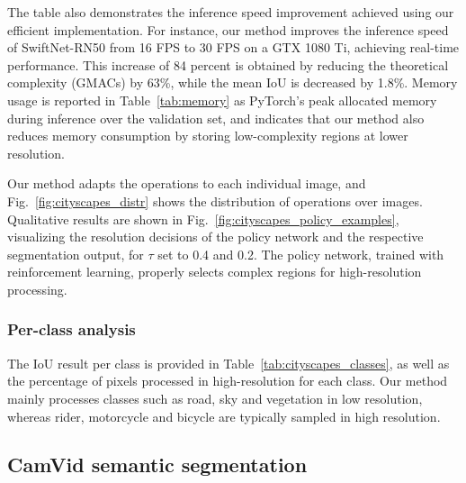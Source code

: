 The table also demonstrates the inference speed improvement achieved using our efficient implementation.
For instance, our method improves the inference speed of SwiftNet-RN50 from 16 FPS to 30 FPS on a GTX 1080 Ti, achieving real-time performance. This increase of 84 percent is obtained by reducing the theoretical complexity (GMACs) by 63\%,  while the mean IoU is decreased by 1.8\%.
Memory usage is reported in Table~\ref{tab:memory} as PyTorch's peak allocated memory during inference over the validation set, and indicates that our method also reduces memory consumption by storing low-complexity regions at lower resolution.

Our method adapts the operations to each individual image, and Fig.~\ref{fig:cityscapes_distr} shows the distribution of operations over images.
Qualitative results are shown in Fig.~\ref{fig:cityscapes_policy_examples}, visualizing the resolution decisions of the policy network and the respective segmentation output, for $\tau$ set to 0.4 and 0.2. The policy network, trained with reinforcement learning, properly selects complex regions for high-resolution processing. 

\subsubsection{Per-class analysis}
The IoU result per class is provided in Table~\ref{tab:cityscapes_classes}, as well as the percentage of pixels processed in high-resolution for each class. Our method mainly processes classes such as road, sky and vegetation in low resolution, whereas rider, motorcycle and bicycle are typically sampled in high resolution.




\subsection{CamVid semantic segmentation}

